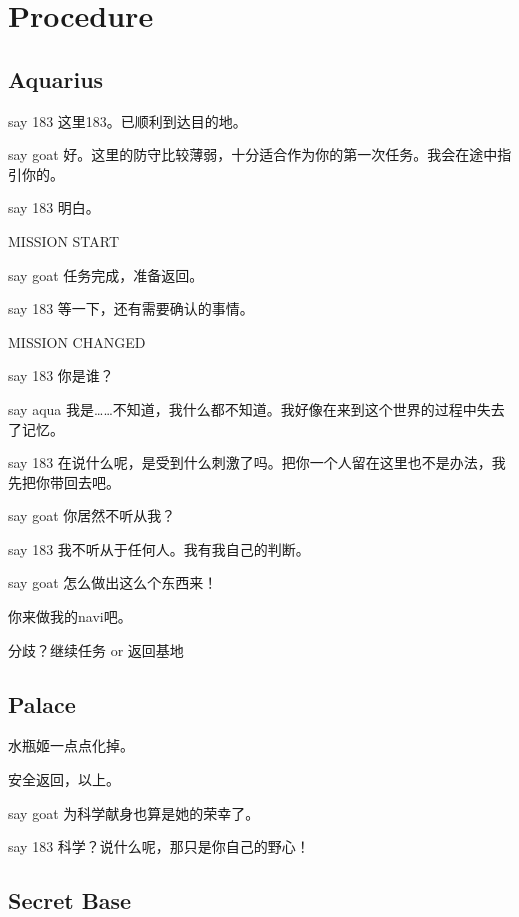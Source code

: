 \documentclass{article}
\begin{document}
\section{Procedure}



\subsection{Aquarius}

say 183 这里183。已顺利到达目的地。

say goat 好。这里的防守比较薄弱，十分适合作为你的第一次任务。我会在途中指引你的。

say 183 明白。

MISSION START

say goat 任务完成，准备返回。

say 183 等一下，还有需要确认的事情。

MISSION CHANGED

say 183 你是谁？

say aqua 我是……不知道，我什么都不知道。我好像在来到这个世界的过程中失去了记忆。

say 183 在说什么呢，是受到什么刺激了吗。把你一个人留在这里也不是办法，我先把你带回去吧。

say goat 你居然不听从我？

say 183 我不听从于任何人。我有我自己的判断。

say goat 怎么做出这么个东西来！

你来做我的navi吧。

分歧？继续任务 or 返回基地



\subsection{Palace}

水瓶姬一点点化掉。

安全返回，以上。


say goat 为科学献身也算是她的荣幸了。

say 183 科学？说什么呢，那只是你自己的野心！

\subsection{Secret Base}
\end{document}
